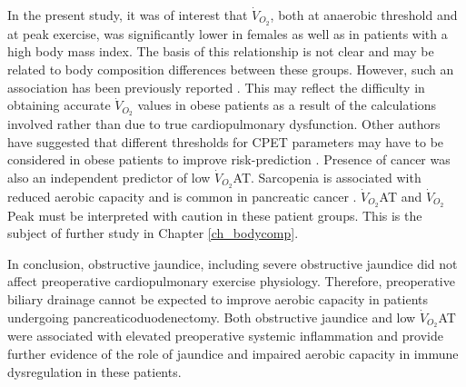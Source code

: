 In the present study, it was of interest that $\dot{V}_{O_2}$, both at anaerobic threshold and at peak exercise, was significantly lower in females as well as in patients with  a high body mass index.
The basis of this relationship is not clear and may be related to body composition differences between these groups.
However, such an association has been previously reported \parencite{horwich_relationship_2009}.
This may reflect the difficulty in obtaining accurate $\dot{V}_{O_2}$ values in obese patients as a result of the calculations involved rather than due to true cardiopulmonary dysfunction. 
Other authors have suggested that different thresholds for CPET parameters may have to be considered in obese patients to improve risk-prediction \parencite{donnelly_criteria_1990,hulens_exercise_2001}.
Presence of cancer was also an independent predictor of low $\dot{V}_{O_2}$AT.
Sarcopenia is associated with reduced aerobic capacity \parencite{evans_sarcopenia_1993} and is common in pancreatic cancer \parencite{joglekar_sarcopenia_2015}.
$\dot{V}_{O_2}$AT and $\dot{V}_{O_2}$Peak must be interpreted with caution in these patient groups.
This is the subject of further study in Chapter \ref{ch_bodycomp}.

In conclusion, obstructive jaundice, including severe obstructive jaundice did not affect preoperative cardiopulmonary exercise physiology. 
Therefore, preoperative biliary drainage cannot be expected to improve aerobic capacity in patients undergoing pancreaticoduodenectomy.
Both obstructive jaundice and low $\dot{V}_{O_2}$AT were associated with elevated preoperative systemic inflammation and provide further evidence of the role of jaundice and impaired aerobic capacity in immune dysregulation in these patients.
